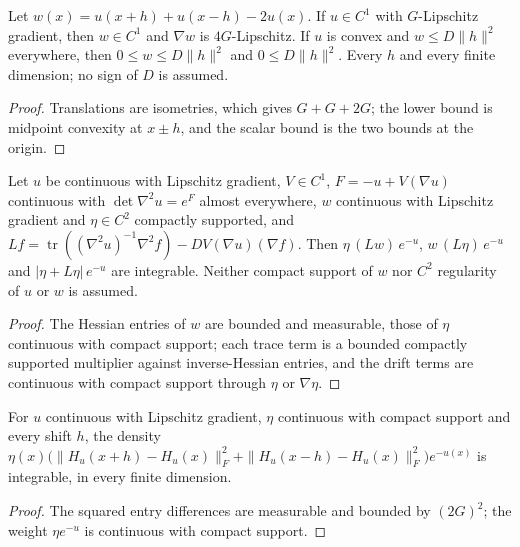 \begin{lemma}
  \label{lem:centered-difference-regularity-bounds}
  \leanok
  Let $w(x)=u(x+h)+u(x-h)-2u(x)$. If $u\in C^1$ with $G$-Lipschitz gradient, then $w\in C^1$ and $\nabla w$ is
  $4G$-Lipschitz. If $u$ is convex and $w\le D\|h\|^2$ everywhere, then $0\le w\le D\|h\|^2$ and $0\le D\|h\|^2$. Every $h$
  and every finite dimension; no sign of $D$ is assumed.
\end{lemma}
\begin{proof}
  \leanok
  Translations are isometries, which gives $G+G+2G$; the lower bound is midpoint convexity at $x\pm h$, and the scalar
  bound is the two bounds at the origin.
\end{proof}

\begin{lemma}
  \label{lem:letwin-weak-generator-integrability}
  \leanok
  Let $u$ be continuous with Lipschitz gradient, $V\in C^1$, $F=-u+V(\nabla u)$ continuous with $\det\nabla^2u=e^F$ almost
  everywhere, $w$ continuous with Lipschitz gradient and $\eta\in C^2$ compactly supported, and
  $Lf=\operatorname{tr}((\nabla^2u)^{-1}\nabla^2f)-DV(\nabla u)(\nabla f)$. Then $\eta\,(Lw)\,e^{-u}$, $w\,(L\eta)\,e^{-u}$ and
  $|\eta+L\eta|\,e^{-u}$ are integrable. Neither compact support of $w$ nor $C^2$ regularity of $u$ or $w$ is assumed.
\end{lemma}
\begin{proof}
  \leanok
  The Hessian entries of $w$ are bounded and measurable, those of $\eta$ continuous with compact support; each trace term is
  a bounded compactly supported multiplier against inverse-Hessian entries, and the drift terms are continuous with compact
  support through $\eta$ or $\nabla\eta$.
\end{proof}

\begin{lemma}
  \label{lem:letwin-hessian-increment-integrability}
  \leanok
  For $u$ continuous with Lipschitz gradient, $\eta$ continuous with compact support and every shift $h$, the density
  $\eta(x)\bigl(\|H_u(x+h)-H_u(x)\|_F^2+\|H_u(x-h)-H_u(x)\|_F^2\bigr)e^{-u(x)}$ is integrable, in every finite dimension.
\end{lemma}
\begin{proof}
  \leanok
  The squared entry differences are measurable and bounded by $(2G)^2$; the weight $\eta e^{-u}$ is continuous with compact
  support.
\end{proof}

